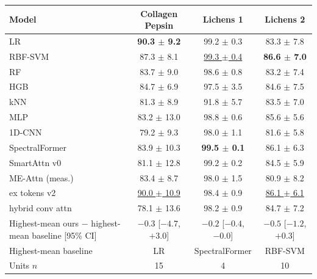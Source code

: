 \small
\begin{tabular}{lccc}
\toprule
Model & Collagen Pepsin & Lichens 1 & Lichens 2 \\
\midrule
LR & \textbf{90.3 $\pm$ 9.2} & 99.2 $\pm$ 0.3 & 83.3 $\pm$ 7.8 \\
RBF-SVM & 87.3 $\pm$ 8.1 & \underline{99.3 $\pm$ 0.4} & \textbf{86.6 $\pm$ 7.0} \\
RF & 83.7 $\pm$ 9.0 & 98.6 $\pm$ 0.8 & 83.2 $\pm$ 7.4 \\
HGB & 84.7 $\pm$ 6.9 & 97.5 $\pm$ 3.5 & 84.6 $\pm$ 7.5 \\
kNN & 81.3 $\pm$ 8.9 & 91.8 $\pm$ 5.7 & 83.5 $\pm$ 7.0 \\
MLP & 83.2 $\pm$ 13.0 & 98.8 $\pm$ 0.6 & 85.6 $\pm$ 5.6 \\
1D-CNN & 79.2 $\pm$ 9.3 & 98.0 $\pm$ 1.1 & 81.6 $\pm$ 5.8 \\
SpectralFormer & 83.9 $\pm$ 10.3 & \textbf{99.5 $\pm$ 0.1} & 86.1 $\pm$ 6.3 \\
\midrule
SmartAttn v0 & 81.1 $\pm$ 12.8 & 99.2 $\pm$ 0.2 & 84.5 $\pm$ 5.9 \\
ME-Attn (meas.) & 83.4 $\pm$ 8.7 & 98.0 $\pm$ 1.5 & 80.9 $\pm$ 8.2 \\
ex tokens v2 & \underline{90.0 $\pm$ 10.9} & 98.4 $\pm$ 0.9 & \underline{86.1 $\pm$ 6.1} \\
hybrid conv attn & 78.1 $\pm$ 13.6 & 98.2 $\pm$ 0.9 & 84.7 $\pm$ 7.2 \\
\midrule
Highest-mean ours $-$ highest-mean baseline [95\% CI] & $-0.3$ [$-4.7$, $+3.0$] & $-0.2$ [$-0.4$, $-0.0$] & $-0.5$ [$-1.2$, $+0.3$] \\
Highest-mean baseline & LR & SpectralFormer & RBF-SVM \\
\midrule
Units $n$ & 15 & 4 & 10 \\
\bottomrule
\end{tabular}
